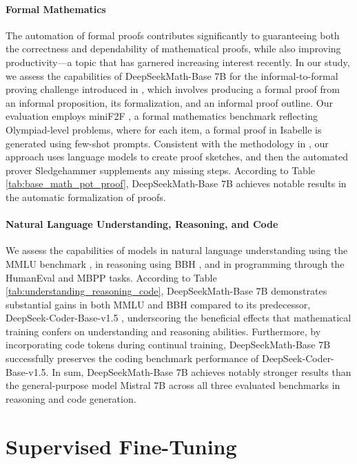 \begin{itemize}[topsep=0pt]
\paragraph{Formal Mathematics}

The automation of formal proofs contributes significantly to guaranteeing both the correctness and dependability of mathematical proofs, while also improving productivity—a topic that has garnered increasing interest recently. In our study, we assess the capabilities of DeepSeekMath-Base 7B for the informal-to-formal proving challenge introduced in \citep{dsp_proof}, which involves producing a formal proof from an informal proposition, its formalization, and an informal proof outline. Our evaluation employs miniF2F \citep{minif2f}, a formal mathematics benchmark reflecting Olympiad-level problems, where for each item, a formal proof in Isabelle is generated using few-shot prompts. Consistent with the methodology in \cite{dsp_proof}, our approach uses language models to create proof sketches, and then the automated prover Sledgehammer \citep{sledgehammer} supplements any missing steps. According to Table \ref{tab:base_math_pot_proof}, DeepSeekMath-Base 7B achieves notable results in the automatic formalization of proofs.

\paragraph{Natural Language Understanding, Reasoning, and Code}

We assess the capabilities of models in natural language understanding using the MMLU benchmark \citep{mmlu}, in reasoning using BBH \citep{bbh}, and in programming through the HumanEval \citep{codex} and MBPP \citep{mbpp} tasks. According to Table \ref{tab:understanding_reasoning_code}, DeepSeekMath-Base 7B demonstrates substantial gains in both MMLU and BBH compared to its predecessor, DeepSeek-Coder-Base-v1.5 \citep{deepseek-coder}, underscoring the beneficial effects that mathematical training confers on understanding and reasoning abilities. Furthermore, by incorporating code tokens during continual training, DeepSeekMath-Base 7B successfully preserves the coding benchmark performance of DeepSeek-Coder-Base-v1.5. In sum, DeepSeekMath-Base 7B achieves notably stronger results than the general-purpose model Mistral 7B \citep{mistral} across all three evaluated benchmarks in reasoning and code generation.

\section{Supervised Fine-Tuning}


\end{itemize}
